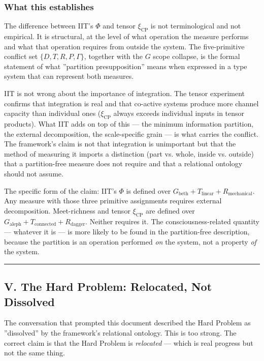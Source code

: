\documentclass[12pt,a4paper]{article}
\begin{document}
\subsubsection{What this establishes}

The difference between IIT's $\Phi$ and tensor $\xi_\text{CP}$ is not terminological and not empirical. It is structural, at the level of what operation the measure performs and what that operation requires from outside the system. The five-primitive conflict set $\{D, T, R, P, \Gamma\}$, together with the $G$ scope collapse, is the formal statement of what ''partition presupposition'' means when expressed in a type system that can represent both measures.

IIT is not wrong about the importance of integration. The tensor experiment confirms that integration is real and that co-active systems produce more channel capacity than individual ones ($\xi_\text{CP}$ always exceeds individual inputs in tensor products). What IIT adds on top of this --- the minimum information partition, the external decomposition, the scale-specific grain --- is what carries the conflict. The framework's claim is not that integration is unimportant but that the method of measuring it imports a distinction (part vs. whole, inside vs. outside) that a partition-free measure does not require and that a relational ontology should not assume.

The specific form of the claim: IIT's $\Phi$ is defined over $G_\text{beth} + T_\text{linear} + R_\text{mechanical}$. Any measure with those three primitive assignments requires external decomposition. Meet-richness and tensor $\xi_\text{CP}$ are defined over $G_\text{aleph} + T_{\text{connected}} + R_\text{dagger}$. Neither requires it. The consciousness-related quantity --- whatever it is --- is more likely to be found in the partition-free description, because the partition is an operation performed \emph{on} the system, not a property \emph{of} the system.

\begin{center}
\rule{0.5\textwidth}{0.4pt}
\end{center}

\subsection{V. The Hard Problem: Relocated, Not Dissolved}

The conversation that prompted this document described the Hard Problem as ''dissolved'' by the framework's relational ontology. This is too strong. The correct claim is that the Hard Problem is \emph{relocated} --- which is real progress but not the same thing.
\end{document}

